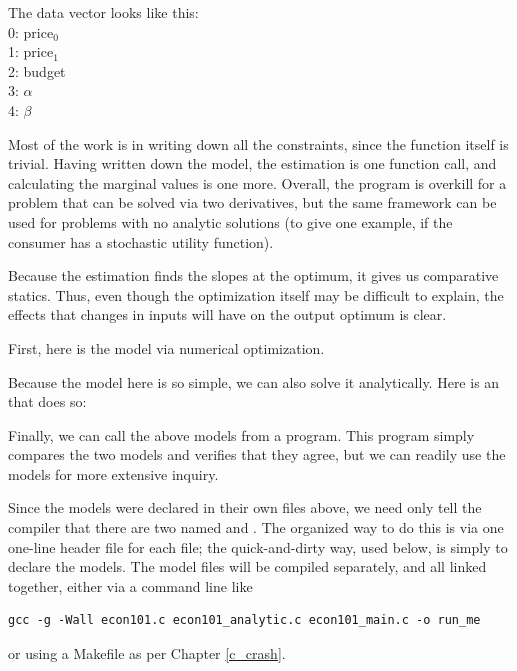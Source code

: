 The data vector looks like this:\\
0:  price$_0$\\
1:  price$_1$\\
2:  budget \\
3:  $\alpha$  \\
4:  $\beta$   
                                                             
Most of the work is in writing down all the constraints, since the
function itself is trivial. Having written down the model, the estimation
is one function call, and calculating the marginal values is one more.
Overall, the program is overkill for a problem that can be solved via
two derivatives, but the same framework can be used for problems with no
analytic solutions (to give one example, if the consumer has a stochastic
utility function).

Because the estimation finds the slopes at the optimum, it gives us
comparative statics. Thus, even though the optimization itself may be
difficult to explain, the effects that changes in inputs will have on
the output optimum is clear.

First, here is the model via numerical optimization.


Because the model here is so simple, we can also solve it analytically.
Here is an  that does so:


Finally, we can call the above models from a program. This program
simply compares the two models and verifies that they agree, but we can
readily use the models for more extensive inquiry.


Since the models were declared in their own files above, we need only
tell the compiler that there are two  named
 and 
. The organized way to do this is via one one-line
header file for each  file; the quick-and-dirty way, used below,
is simply to declare the models. The model files will be compiled
separately, and all linked together, either via a command line like
\begin{lstlisting}
gcc -g -Wall econ101.c econ101_analytic.c econ101_main.c -o run_me
\end{lstlisting}
or using a Makefile as per Chapter \ref{c_crash}.


